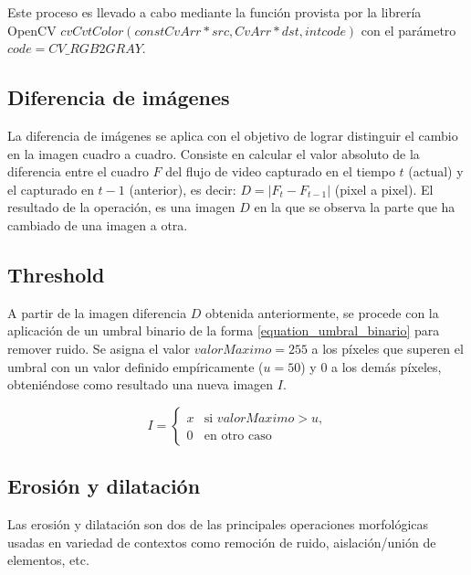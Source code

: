 \documentclass[a4paper,11pt,spanish]{article}
\begin{document}
Este proceso es llevado a cabo mediante la función provista por la librería OpenCV $cvCvtColor(const CvArr* src, CvArr* dst, int code)$ con el parámetro $code=CV\_RGB2GRAY$.


\subsection{Diferencia de imágenes}
La diferencia de imágenes se aplica con el objetivo de lograr distinguir el cambio en la imagen cuadro a cuadro. Consiste en calcular el valor absoluto de la diferencia entre el cuadro $F$ del flujo de video capturado en el tiempo $t$ (actual) y el capturado en $t-1$ (anterior), es decir: $D=|F_{t}-F{_{t-1}}|$ (pixel a pixel). El resultado de la operación, es una imagen $D$ en la que se observa la parte que ha cambiado de una imagen a otra.

\subsection{Threshold}
\label{subsub_ymbral}
A partir de la imagen diferencia $D$ obtenida anteriormente, se procede con la aplicación de un umbral binario de la forma \eqref{equation_umbral_binario} para remover ruido. Se asigna el valor $valorMaximo=255$ a los píxeles que superen el umbral con un valor definido empíricamente ($u=50$) y $0$ a los demás píxeles, obteniéndose como resultado una nueva imagen $I$.

\begin{equation}
\label{equation_umbral_binario}
I= 
\begin{cases} x & \text{si $valorMaximo>u$,}
\\
0 &\text{en otro caso}
\end{cases}
\end{equation}

\subsection{Erosión y dilatación}
Las erosión y dilatación son dos de las principales operaciones morfológicas usadas en variedad de contextos como remoción de ruido, aislación/unión de elementos, etc.
\end{document}
